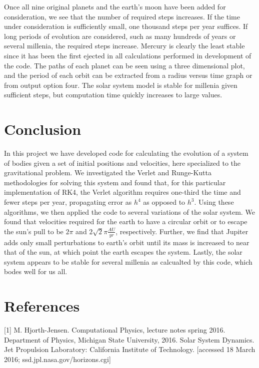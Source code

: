 \documentclass[11pt,a4paper]{article}
\begin{document}
Once all nine original planets and the earth's moon have been added for consideration, we see that the number of required steps increases. If the time under consideration is sufficiently small, one thousand steps per year suffices. If long periods of evolution are considered, such as many hundreds of years or several millenia, the required steps increase. Mercury is clearly the least stable since it has been the first ejected in all calculations performed in development of the code. The paths of each planet can be seen using a three dimensional plot, and the period of each orbit can be extracted from a radius versus time graph or from output option four. The solar system model is stable for millenia given sufficient steps, but computation time quickly increases to large values.

\section{Conclusion}

In this project we have developed code for calculating the evolution of a system of bodies given a set of initial positions and velocities, here specialized to the gravitational problem. We investigated the Verlet and Runge-Kutta methodologies for solving this system and found that, for this particular implementation of RK4, the Verlet algorithm requires one-third the time and fewer steps per year, propagating error as $h^4$ as opposed to $h^3$. Using these algorithms, we then applied the code to several variations of the solar system. We found that velocities required for the earth to have a circular orbit or to escape the sun's pull to be $2\pi$ and $2\sqrt{2}\pi \frac{AU}{yr}$, respectively. Further, we find that Jupiter adds only small perturbations to earth's orbit until its mass is increased to near that of the sun, at which point the earth escapes the system. Lastly, the solar system appears to be stable for several millenia as calcualted by this code, which bodes well for us all.

\section{References}

[1] M. Hjorth-Jensen. Computational Physics, lecture notes spring 2016. Department of Physics, Michigan State University, 2016. \newline
[2] Solar System Dynamics. Jet Propulsion Laboratory: California Institute of Technology.  [accessed 18 March 2016; ssd.jpl.nasa.gov/horizons.cgi] \newline
\end{document}
